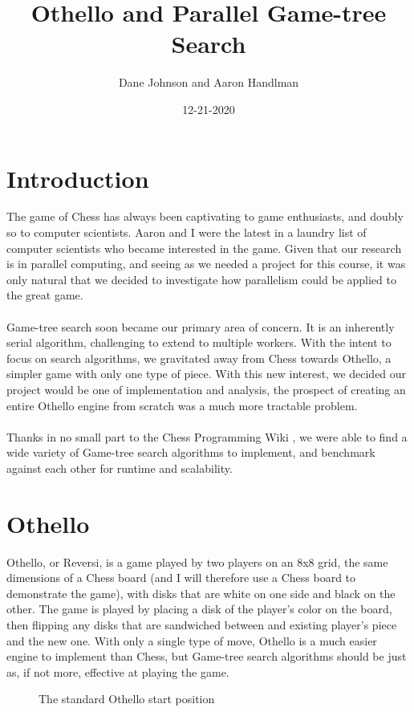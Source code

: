 \documentclass[]{article}
\author{Dane Johnson and Aaron Handlman}
\date{12-21-2020}
\title{Othello and Parallel Game-tree Search}
\begin{document}
\maketitle

\section{Introduction}
The game of Chess has always been captivating to game enthusiasts, and doubly so to computer scientists.
Aaron and I were the latest in a laundry list of computer scientists who became interested in the game.
Given that our research is in parallel computing, and seeing as we needed a project for this course, it
was only natural that we decided to investigate how parallelism could be applied to the great game.
\\ \\
Game-tree search soon became our primary area of concern. It is an inherently serial algorithm,
challenging to extend to multiple workers. With the intent to focus on search algorithms, we gravitated
away from Chess towards Othello, a simpler game with only one type of piece. With this new interest,
we decided our project would be one of implementation and analysis, the prospect of creating an entire
Othello engine from scratch was a much more tractable problem.
\\ \\
Thanks in no small part to the Chess Programming Wiki \cite{cpw}, we were able to find a wide variety
of Game-tree search algorithms to implement, and benchmark against each other for runtime and
scalability.
\section{Othello}
Othello, or Reversi, is a game played by two players on an 8x8 grid, the same dimensions
of a Chess board (and I will therefore use a Chess board to demonstrate the game), with disks that
are white on one side and black on the other.
The game is played by placing a disk of the player's color on the board, then flipping
any disks that are sandwiched between and existing player's piece and the new one.
With only a single type of move, Othello is a much easier engine to implement than Chess, but Game-tree
search algorithms should be just as, if not more, effective at playing the game.
\begin{figure}
  \caption{The standard Othello start position}
  \centering
  \newgame
{}
\showboard
\end{figure}
\end{document}
